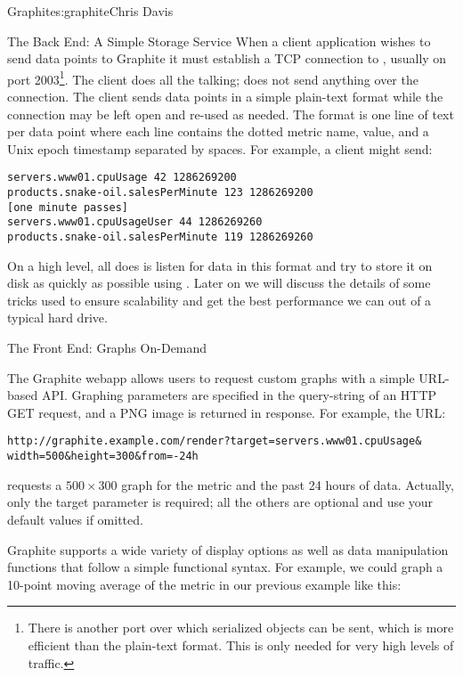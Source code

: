 \begin{aosachapter}{Graphite}{s:graphite}{Chris Davis}
\begin{aosasect1}{The Back End: A Simple Storage Service}
When a client application wishes to send data points to Graphite it
must establish a TCP connection to , usually on port
2003\footnote{There is another port over which serialized objects can
be sent, which is more efficient than the plain-text format. This is
only needed for very high levels of traffic.}.  The client does all
the talking;  does not send anything over the connection. The
client sends data points in a simple plain-text format while the
connection may be left open and re-used as needed. The format is one
line of text per data point where each line contains the dotted metric
name, value, and a Unix epoch timestamp separated by spaces.  For
example, a client might send:

\begin{verbatim}
servers.www01.cpuUsage 42 1286269200
products.snake-oil.salesPerMinute 123 1286269200
[one minute passes]
servers.www01.cpuUsageUser 44 1286269260
products.snake-oil.salesPerMinute 119 1286269260
\end{verbatim}

On a high level, all  does is listen for data in this format and
try to store it on disk as quickly as possible using . Later on
we will discuss the details of some tricks used to ensure scalability
and get the best performance we can out of a typical hard drive.

\end{aosasect1}

\begin{aosasect1}{The Front End: Graphs On-Demand}

The Graphite webapp allows users to request custom graphs with a
simple URL-based API\@. Graphing parameters are specified in the
query-string of an HTTP GET request, and a PNG image is returned in
response. For example, the URL:
\begin{verbatim}
http://graphite.example.com/render?target=servers.www01.cpuUsage&
width=500&height=300&from=-24h
\end{verbatim}

\noindent requests a $500{\times}300$ graph for the metric
 and the past 24 hours of data. Actually,
only the target parameter is required; all the others are optional and
use your default values if omitted.

Graphite supports a wide variety of display options as well as data
manipulation functions that follow a simple functional syntax. For
example, we could graph a 10-point moving average of the metric in our
previous example like this:


\end{aosasect1}
\end{aosachapter}
